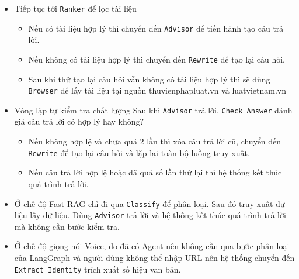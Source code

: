 \begin{itemize}
\begin{itemize}
\end{itemize}

\item Tiếp tục tới \texttt{Ranker} để lọc tài liệu

\begin{itemize}

\item Nếu có tài liệu hợp lý
thì
chuyển đến \texttt{Advisor}
để tiến hành tạo câu trả lời.

\item Nếu không có tài liệu hợp lý
thì
chuyển đến \texttt{Rewrite}
để tạo lại câu hỏi.

\item Sau khi thử tạo lại câu hỏi
vẫn không có tài liệu hợp lý
thì sẽ dùng \texttt{Browser}
để lấy tài liệu
tại nguồn
thuvienphapluat.vn và luatvietnam.vn

\end{itemize}

\item Vòng lặp tự kiểm tra chất lượng
Sau khi \texttt{Advisor} trả lời,
\texttt{Check Answer} đánh giá câu trả lời có hợp lý hay không?

\begin{itemize}

\item Nếu không hợp lệ và chưa quá 2 lần
thì xóa câu trả lời cũ,
chuyển đến \texttt{Rewrite}
để tạo lại câu hỏi
và
lặp lại toàn bộ luồng truy xuất.

\item Nếu câu trả lời hợp lệ hoặc đã quá số lần thử lại
thì
hệ thống kết thúc quá trình trả lời.
\end{itemize}

\item Ở chế độ Fast RAG
chỉ đi qua \texttt{Classify} để phân loại.
Sau đó truy xuất dữ liệu lấy dữ liệu.
Dùng \texttt{Advisor} trả lời
và
hệ thống kết thúc quá trình trả lời
mà không cần bước kiểm tra.

\item Ở chế độ giọng nói Voice,
do đã có Agent nên không cần qua bước phân loại của LangGraph
và người dùng không thể nhập URL nên hệ thống chuyển đến \texttt{Extract Identity} trích xuất số hiệu văn bản.

\end{itemize}
